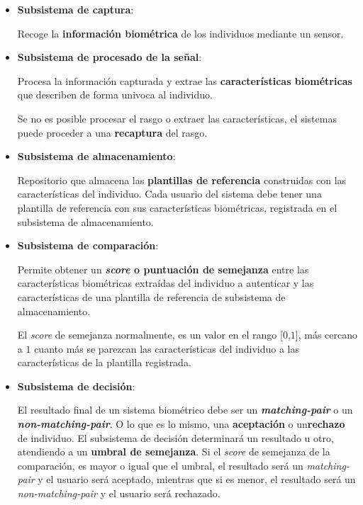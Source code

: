 \begin{itemize}
    \item 
    \textbf{Subsistema de captura}:
    
    Recoge la \textbf{información biométrica} de los individuos mediante un sensor.
    \item 
    \textbf{Subsistema de procesado de la señal}:
    
    Procesa la información capturada y extrae las \textbf{características biométricas} que describen de forma univoca al individuo.  
    
    Se no es posible procesar el rasgo o extraer las características, el sistemas puede proceder a una \textbf{recaptura} del rasgo.
    \item 
    \textbf{Subsistema de almacenamiento}:
    
    Repositorio que almacena las \textbf{plantillas de referencia} construidas con las características del individuo. Cada usuario del sistema debe tener una plantilla de referencia con sus características biométricas, registrada en el subsistema de almacenamiento. 
    \item 
    \textbf{Subsistema de comparación}:
    
    Permite obtener un \textbf{\textit{score} o puntuación de semejanza} entre las características biométricas extraídas del individuo a autenticar y las características de una plantilla de referencia de subsistema de almacenamiento.
    
    El \textit{score} de semejanza normalmente, es un valor en el rango [$0$,$1$], más cercano a $1$ cuanto más se parezcan las características del individuo a las características de la plantilla registrada.
    
    \item 
    \textbf{Subsistema de decisión}:
    
    El resultado final de un sistema biométrico debe ser un \textbf{\textit{matching-pair}} o un \textbf{\textit{non-matching-pair}}. O lo que es lo mismo, una \textbf{aceptación} o un\textbf{rechazo} de individuo. El subsistema de decisión determinará un resultado u otro, atendiendo a un \textbf{umbral de semejanza}. Si el \textit{score} de semejanza de la comparación, es mayor o igual que el umbral, el resultado será un \textit{matching-pair} y el usuario será aceptado, mientras que si es menor, el resultado será un \textit{non-matching-pair} y el usuario será rechazado.
\end{itemize}

